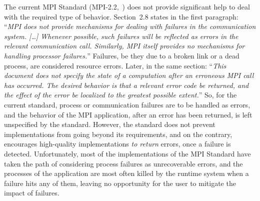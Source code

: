 The current MPI Standard (MPI-2.2,~\cite{MPI22}) does not provide
significant help to deal with the required type of behavior. Section~2.8
states in the first paragraph: ``\emph{MPI does not provide mechanisms
  for dealing with failures in the communication system. [\ldots]
  Whenever possible, such failures will be reflected as errors in the
  relevant communication call. Similarly, MPI itself provides no
  mechanisms for handling processor failures.}'' Failures, be they due
to a broken link or a dead process, are considered  resource
errors. Later, in the same section: ``\emph{This document does not
  specify the state of a computation after an erroneous MPI call has
  occurred. The desired behavior is that a relevant error code be
  returned, and the effect of the error be localized to the greatest
  possible extent.}'' So, for the current standard, process or
communication failures are to be handled as errors, and the behavior
of the MPI application, after an error has been returned, is left
unspecified by the standard. However, the standard does not prevent
implementations from going beyond its requirements, and on the contrary,
encourages high-quality implementations \emph{to return} errors, once a
failure is detected. Unfortunately, most of the implementations of the 
MPI Standard have taken the path of considering process failures as 
unrecoverable errors, and the processes of the application are most 
often killed by the runtime system when a failure hits any of them, 
leaving no opportunity for the user to mitigate the impact of 
failures. 

